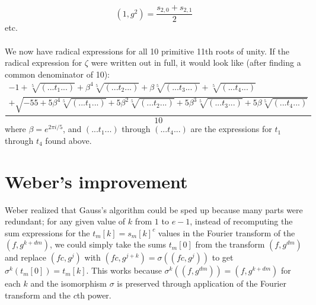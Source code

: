 \documentclass{article}
\begin{document}
        $$ (1, g^2) = \frac{s_{2, 0} + s_{2, 1}}{2} $$
        etc.\\
        \\
        We now have radical expressions for all 10 primitive 11th roots of unity. If the radical expression for $ \zeta $ were written out in full, it would look like (after finding a common denominator of 10):
        $$ \frac{\begin{array}{c} -1 + \sqrt[5]{(...t_1...)} + \beta^4 \sqrt[5]{(...t_2...)} + \beta \sqrt[5]{(...t_3...)} + \sqrt[5]{(...t_4...)} \\ + \sqrt{-55 + 5 \beta^4 \sqrt[5]{(...t_1...)} + 5 \beta^2 \sqrt[5]{(...t_2...)} + 5 \beta^3 \sqrt[5]{(...t_3...)} + 5 \beta \sqrt[5]{(...t_4...)}} \end{array}}{10} $$
        where $ \beta = e^{2 \pi i/5} $, and $ (...t_1...) $ through $ (...t_4...) $ are the expressions for $ t_1 $ through $ t_4 $ found above.\\
\section{Weber's improvement}
    Weber realized that Gauss's algorithm could be sped up because many parts were redundant; for any given value of $ k $ from $ 1 $ to $ e - 1 $, instead of recomputing the sum expressions for the $ t_m[k] = s_m[k]^c $ values in the Fourier transform of the $ (f, g^{k + dm}) $, we could simply take the sums $ t_m[0] $ from the transform $ (f, g^{dm}) $ and replace $ (fc, g^j) $ with $ (fc, g^{j + k}) = \sigma((fc, g^j)) $ to get $ \sigma^k(t_m[0]) = t_m[k] $. This works because $ \sigma^k((f, g^{dm})) = (f, g^{k + dm}) $ for each $ k $ and the isomorphism $ \sigma $ is preserved through application of the Fourier transform and the $ c $th power.\\
\end{document}

